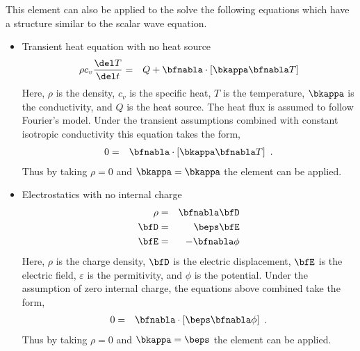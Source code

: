 This element can also be applied to the solve the following 
equations which have a structure similar to the scalar wave equation. 
\begin{itemize}
\item{Transient heat equation with no heat source}
\begin{eqnarray}
\rho c_v \frac{\del T}{\del t} &=& 
          Q + \bfnabla\cdot\left[\bkappa\bfnabla T \right]
\end{eqnarray}
Here, $\rho$ is the density, $c_v$ is the specific heat, $T$ is 
the temperature, $\bkappa$ is the conductivity, and $Q$ is the
heat source. The heat flux is assumed to follow Fourier's model.
Under the transient assumptions combined with constant isotropic 
conductivity this equation takes the form,
\begin{eqnarray}
0 &=& \bfnabla\cdot\left[\bkappa\bfnabla T \right]~.
\end{eqnarray}
Thus by taking $\rho=0$ and $\bkappa=\bkappa$ the element can be applied.
\item{Electrostatics with no internal charge}
\begin{eqnarray}
\rho &=& \bfnabla \bfD \\
\bfD &=& \beps \bfE \\
\bfE &=&-\bfnabla \phi 
\end{eqnarray}
Here, $\rho$ is the charge density, $\bfD$ is the electric displacement,
$\bfE$ is the electric field, $\varepsilon$ is the permitivity, and $\phi$
is the potential. Under the assumption of zero internal charge, the 
equations above combined take the form, 
\begin{eqnarray}
0 &=& \bfnabla\cdot\left[\beps\bfnabla \phi \right]~.
\end{eqnarray}
Thus by taking $\rho=0$ and $\bkappa=\beps$ the element can be 
applied.
\end{itemize}

